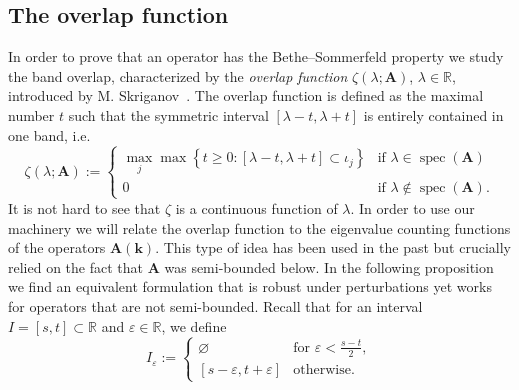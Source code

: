 \documentclass[10pt]{amsart}
\theoremstyle{definition}\newtheorem{defi}[theo]{Definition}\newtheorem{rema}[theo]{Remark}\newtheorem{exam}[theo]{Example}\newtheorem{nota}[theo]{Notation}
\DeclareMathOperator{\spec}{spec}
\newcommand{\R}{\mathbb R}
\newcommand{\BA}{\mathbf A}
\newcommand{\bk}{\mathbf k}
\newcommand{\eps}{\varepsilon}
\begin{document}
\subsection{The overlap function}
In order to prove that an operator has the Bethe--Sommerfeld property we study the band overlap, characterized by the \emph{overlap function} $\zeta(\lambda;\BA)$, $\lambda \in \R$, introduced by M. Skriganov~\cite{Skriganov}. The overlap function is defined as the maximal number $t$ such that the symmetric interval $[\lambda-t,\lambda+t]$ is entirely contained in one band, i.e.
\begin{equation}\label{eq:defnoverlap}
\zeta(\lambda;\BA) :=
\begin{cases}
\max_j \max\left\{t \ge 0 : [\lambda-t,\lambda+t] \subset \iota_j\right\} & \text{if } \lambda \in
\spec(\BA)\\
0 & \text{if }\lambda \not \in \spec(\BA).
\end{cases}
\end{equation}
It is not hard to see that $\zeta$ is a continuous function of $\lambda$. In order to use our machinery we will relate the overlap function to the eigenvalue counting functions of the operators $\BA(\bk)$. This type of idea has been used in the past but crucially relied on the fact that $\BA$ was semi-bounded below. In the following proposition we find an equivalent formulation that is robust under perturbations yet works for operators that are not semi-bounded. Recall that for an interval $I = [s,t] \subset \R$ and $\eps
\in \R$, we define
\begin{equation}
I_\eps :=
\begin{cases}
\varnothing & \text{for } \eps < \frac{s-t}{2}, \\
[s - \eps,t + \eps] & \text{otherwise.}
\end{cases}
\end{equation}
\end{document}
